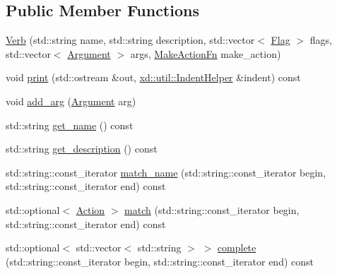 \subsection*{Public Member Functions}
\begin{DoxyCompactItemize}
\item 
\mbox{\hyperlink{classxd_1_1repl_1_1cmd_1_1_verb_a3115cbb9c532e4774185ef04a51a28db}{Verb}} (std\+::string name, std\+::string description, std\+::vector$<$ \mbox{\hyperlink{classxd_1_1repl_1_1cmd_1_1_flag}{Flag}} $>$ flags, std\+::vector$<$ \mbox{\hyperlink{classxd_1_1repl_1_1cmd_1_1_argument}{Argument}} $>$ args, \mbox{\hyperlink{classxd_1_1repl_1_1cmd_1_1_verb_a4697828dfca6ef6386df54aa3a6a5857}{Make\+Action\+Fn}} make\+\_\+action)
\item 
void \mbox{\hyperlink{classxd_1_1repl_1_1cmd_1_1_verb_ad7ccfcaf2e157956c376ac7407c83483}{print}} (std\+::ostream \&out, \mbox{\hyperlink{classxd_1_1util_1_1_indent_helper}{xd\+::util\+::\+Indent\+Helper}} \&indent) const
\item 
void \mbox{\hyperlink{classxd_1_1repl_1_1cmd_1_1_verb_aaff144624594b846c6e7b287babfdc0e}{add\+\_\+arg}} (\mbox{\hyperlink{classxd_1_1repl_1_1cmd_1_1_argument}{Argument}} arg)
\item 
std\+::string \mbox{\hyperlink{classxd_1_1repl_1_1cmd_1_1_verb_a7b06a5c832eb6d0c61fa90da7631d7e8}{get\+\_\+name}} () const
\item 
std\+::string \mbox{\hyperlink{classxd_1_1repl_1_1cmd_1_1_verb_a0e66bbd2015f8becba3262b2388e2681}{get\+\_\+description}} () const
\item 
std\+::string\+::const\+\_\+iterator \mbox{\hyperlink{classxd_1_1repl_1_1cmd_1_1_verb_a5719b32998c5b7a19b36183bd1235e54}{match\+\_\+name}} (std\+::string\+::const\+\_\+iterator begin, std\+::string\+::const\+\_\+iterator end) const
\item 
std\+::optional$<$ \mbox{\hyperlink{namespacexd_1_1repl_1_1cmd_a7274841bd02a9c5da0ba48ae204ab3d5}{Action}} $>$ \mbox{\hyperlink{classxd_1_1repl_1_1cmd_1_1_verb_ac8f69a959ffea14e0056928c55ebde26}{match}} (std\+::string\+::const\+\_\+iterator begin, std\+::string\+::const\+\_\+iterator end) const
\item 
std\+::optional$<$ std\+::vector$<$ std\+::string $>$ $>$ \mbox{\hyperlink{classxd_1_1repl_1_1cmd_1_1_verb_a3ea85ceb0c367ab47b1781372cbf3817}{complete}} (std\+::string\+::const\+\_\+iterator begin, std\+::string\+::const\+\_\+iterator end) const
\end{DoxyCompactItemize}


